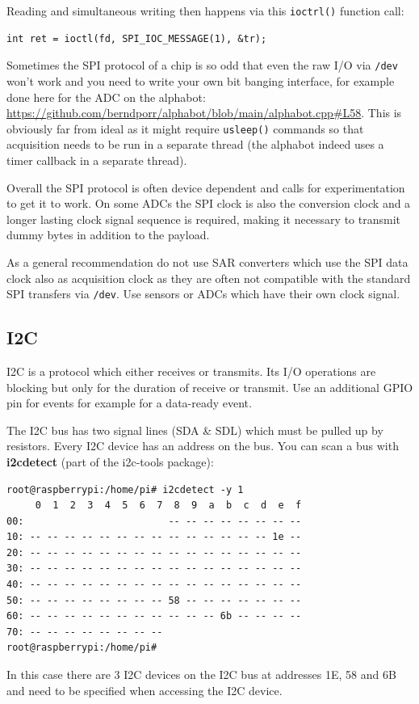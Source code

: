 \documentclass[12pt]{report}
\begin{document}
Reading and simultaneous writing then happens via this \texttt{ioctrl()}
function call:
\begin{verbatim}
int ret = ioctl(fd, SPI_IOC_MESSAGE(1), &tr);
\end{verbatim}

Sometimes the SPI protocol of a chip is so odd that even the raw I/O
via \texttt{/dev} won't work and you need to write your own bit
banging interface, for example done here for the ADC on the alphabot:
\url{https://github.com/berndporr/alphabot/blob/main/alphabot.cpp#L58}.
This is obviously far from ideal as it might require \texttt{usleep()}
commands so that acquisition needs to be run in a separate thread (the
alphabot indeed uses a timer callback in a separate thread).

Overall the SPI protocol is often device dependent and calls
for experimentation to get it to work. On some ADCs the SPI clock is also
the conversion clock and a longer lasting clock signal sequence is required,
making it necessary to transmit dummy bytes in addition to the payload.

As a general recommendation do not use SAR converters which use the
SPI data clock also as acquisition clock as they are often not compatible
with the standard SPI transfers via \texttt{/dev}. Use sensors or ADCs which
have their own clock signal.


\subsection{I2C}
I2C is a protocol which either receives or transmits. Its I/O operations are blocking but only
for the duration of receive or transmit. Use an additional GPIO pin for
events for example for a data-ready event.

The I2C bus has two signal lines (SDA \& SDL) which must be pulled up
by resistors. Every I2C device has an address on the bus. You can scan
a bus with \textbf{i2cdetect} (part of the i2c-tools package):
\begin{verbatim}
root@raspberrypi:/home/pi# i2cdetect -y 1
     0  1  2  3  4  5  6  7  8  9  a  b  c  d  e  f
00:                         -- -- -- -- -- -- -- -- 
10: -- -- -- -- -- -- -- -- -- -- -- -- -- -- 1e -- 
20: -- -- -- -- -- -- -- -- -- -- -- -- -- -- -- -- 
30: -- -- -- -- -- -- -- -- -- -- -- -- -- -- -- -- 
40: -- -- -- -- -- -- -- -- -- -- -- -- -- -- -- -- 
50: -- -- -- -- -- -- -- -- 58 -- -- -- -- -- -- -- 
60: -- -- -- -- -- -- -- -- -- -- -- 6b -- -- -- -- 
70: -- -- -- -- -- -- -- --                         
root@raspberrypi:/home/pi# 
\end{verbatim}
In this case there are 3 I2C devices on the I2C bus at addresses
1E, 58 and 6B and need to be specified when
accessing the I2C device.
\end{document}
